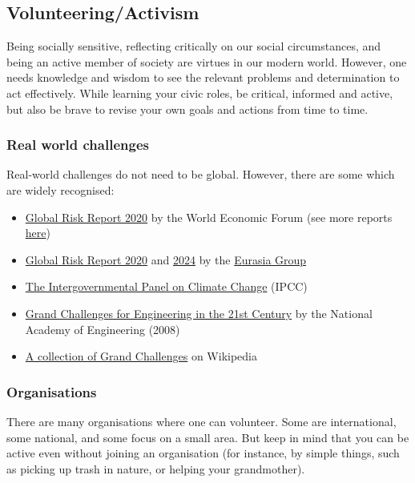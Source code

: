 \documentclass{article}
\begin{document}
\subsection{Volunteering/Activism}

Being socially sensitive, reflecting critically on our social circumstances, and being an active member of society are virtues in our modern world.
However, one needs knowledge and wisdom to see the relevant problems and determination to act effectively.
While learning your civic roles,
be critical, informed and active, but also be brave to revise your own goals and actions from time to time.


\subsubsection{Real world challenges}
Real-world challenges do not need to be global. However, there are some which are widely recognised:
\begin{itemize}
    \item \href{https://web.archive.org/web/20231103160332/https://www.weforum.org/publications/the-global-risks-report-2020}{Global Risk Report 2020} by the World Economic Forum (see more reports \href{https://www.weforum.org/publications/}{here})
    \item \href{https://www.eurasiagroup.net/issues/top-risks-2020}{Global Risk Report 2020} and \href{https://www.eurasiagroup.net/issues/top-risks-2024}{2024} by the \href{https://en.wikipedia.org/wiki/Eurasia_Group}{Eurasia Group}
    \item \href{https://www.ipcc.ch/}{The Intergovernmental Panel on Climate Change} (IPCC)
    \item \href{http://www.engineeringchallenges.org/challenges.aspx}{Grand Challenges for Engineering in the 21st Century} by the National Academy of Engineering (2008)
    \item \href{https://en.wikipedia.org/wiki/Grand_Challenges}{A collection of Grand Challenges} on Wikipedia
\end{itemize}

\subsubsection{Organisations}
There are many organisations where one can volunteer. Some are international, some national, and some focus on a small area.
But keep in mind that you can be active even without joining an organisation (for instance, by simple things, such as picking up trash in nature, or helping your grandmother).
\end{document}
